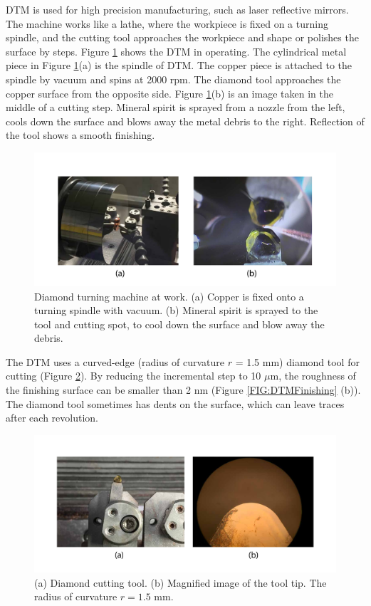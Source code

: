 \documentclass[pdflatex, sectionletters, 12pt, final, phd]{pittetd}    %
\begin{document}
DTM is used for high precision manufacturing, such as laser reflective mirrors. The machine works like a lathe, where the workpiece is fixed on a turning spindle, and the cutting tool approaches the workpiece and shape or polishes the surface by steps. Figure \ref{FIG:DTM} shows the DTM in operating. The cylindrical metal piece in Figure \ref{FIG:DTM}(a) is the spindle of DTM. The copper piece is attached to the spindle by vacuum and spins at 2000 rpm. The diamond tool approaches the copper surface from the opposite side. Figure \ref{FIG:DTM}(b) is an image taken in the middle of a cutting step. Mineral spirit is sprayed from a nozzle from the left, cools down the surface and blows away the metal debris to the right. Reflection of the tool shows a smooth finishing.

\begin{figure}[h!]
	\centering
	\includegraphics[width=1.0\textwidth]{Drawing/DTM.pdf}
	\caption[Diamond turning machine at work]{Diamond turning machine at work. (a) Copper is fixed onto a turning spindle with vacuum. (b) Mineral spirit is sprayed to the tool and cutting spot, to cool down the surface and blow away the debris.}
	\label{FIG:DTM}
\end{figure}

The DTM uses a curved-edge (radius of curvature $r$ = 1.5 mm) diamond tool for cutting (Figure \ref{FIG:DiamondTool}). By reducing the incremental step to 10 $\mu$m, the roughness of the finishing surface can be smaller than 2 nm (Figure \ref{FIG:DTMFinishing} (b)). The diamond tool sometimes has dents on the surface, which can leave traces after each revolution.

\begin{figure}[h!]
	\centering
	\includegraphics[width=1.0\textwidth]{Drawing/DiamondTool.pdf}
	\caption[Images of the diamond tool]{(a) Diamond cutting tool. (b) Magnified image of the tool tip. The radius of curvature $r = 1.5$ mm.}
	\label{FIG:DiamondTool}
\end{figure}
\end{document}
